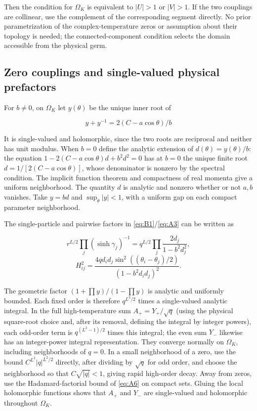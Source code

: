 \documentclass[11pt,a4paper]{article}
\numberwithin{equation}{section}
\theoremstyle{plain}
\theoremstyle{definition}
\begin{document}
Then the condition for \(\Omega_K\) is equivalent to \(|U|>1\) or \(|V|>1\). If the two couplings are collinear, use the complement of the corresponding segment directly. No prior parametrization of the complex-temperature zeros or assumption about their topology is needed; the connected-component condition selects the domain accessible from the physical germ.

\subsection{Zero couplings and single-valued physical prefactors}\label{sec:zero}

For \(b\ne0\), on \(\Omega_K\) let \(y(\theta)\) be the unique inner root of

\[y+y^{-1}=2(C-a\cos\theta)/b\]

It is single-valued and holomorphic, since the two roots are reciprocal and neither has unit modulus. When \(b=0\) define the analytic extension of \(d(\theta)=y(\theta)/b\): the equation \(1-2(C-a\cos\theta)d+b^2 d^2=0\) has at \(b=0\) the unique finite root \(d=1/[2(C-a\cos\theta)]\), whose denominator is nonzero by the spectral condition. The implicit function theorem and compactness of real momenta give a uniform neighborhood. The quantity \(d\) is analytic and nonzero whether or not \(a,b\) vanishes. Take \(y=bd\) and \(\sup_\theta|y|<1\), with a uniform gap on each compact parameter neighborhood.

The single-particle and pairwise factors in \eqref{eq:B1}/\eqref{eq:A3} can be written as

\[r^{L/2}\prod_j(\sinh\gamma_j)^{-1}=q^{L/2}\prod_j\frac{2d_j}{1-b^2d_j^2},\]
\[H_{ij}^2=\frac{4q d_i d_j\sin^2((\theta_i-\theta_j)/2)}{(1-b^2d_i d_j)^2}.\]

The geometric factor \((1+\prod y)/(1-\prod y)\) is analytic and uniformly bounded. Each fixed order is therefore \(q^{L^2/2}\) times a single-valued analytic integral. In the full high-temperature sum \(A_+=Y_+/\sqrt q\) (using the physical square-root choice and, after its removal, defining the integral by integer powers), each odd-order term is \(q^{(L^2-1)/2}\) times this integral; the even sum \(Y_-\) likewise has an integer-power integral representation. They converge normally on \(\Omega_K\), including neighborhoods of \(q=0\). In a small neighborhood of a zero, use the bound \(C^{L^2}|q|^{L^2/2}\) directly, after dividing by \(\sqrt q\) for odd order, and choose the neighborhood so that \(C\sqrt{|q|}<1\), giving rapid high-order decay. Away from zeros, use the Hadamard-factorial bound of \eqref{eq:A6} on compact sets. Gluing the local holomorphic functions shows that \(A_+\) and \(Y_-\) are single-valued and holomorphic throughout \(\Omega_K\).
\end{document}
